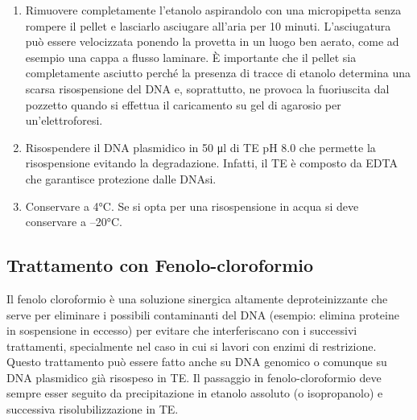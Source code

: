 \begin{enumerate}
  \item Rimuovere completamente l’etanolo aspirandolo con una micropipetta senza rompere il pellet e lasciarlo asciugare
	all’aria per 10 minuti. L’asciugatura può essere velocizzata ponendo la provetta in un luogo ben aerato,
	come ad esempio una cappa a flusso laminare.
	\`E importante che il pellet sia completamente asciutto perché la presenza di tracce di etanolo determina una scarsa
	risospensione del DNA e, soprattutto, ne provoca la fuoriuscita dal pozzetto quando si effettua il caricamento su gel di
	agarosio per un’elettroforesi.

  \item Risospendere il DNA plasmidico in 50 μl di TE pH 8.0 che permette la risospensione evitando la degradazione.
	Infatti, il TE è composto da EDTA che garantisce protezione dalle DNAsi.

  \item Conservare a 4°C. Se si opta per una risospensione in acqua si deve conservare a –20°C.

\end{enumerate}

\subsection{Trattamento con Fenolo-cloroformio}

Il fenolo cloroformio è una soluzione sinergica altamente deproteinizzante che serve per eliminare i possibili
contaminanti del DNA (esempio: elimina proteine in sospensione in eccesso) per evitare che interferiscano con i
successivi trattamenti, specialmente nel caso in cui si lavori con enzimi di restrizione.
Questo trattamento può essere fatto anche su DNA genomico o comunque su DNA plasmidico già risospeso in TE.
Il passaggio in fenolo-cloroformio deve sempre esser seguito da precipitazione in etanolo assoluto (o isopropanolo)
e successiva risolubilizzazione in TE.

